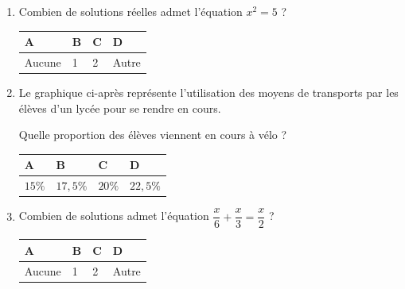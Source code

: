 \documentclass[oneside,12pt]{exam}          %
\begin{document}
\begin{enumerate}[resume*]



	\item Combien de solutions réelles admet l'équation $x^2 = 5$ ?
	
		\hspace{\linewidth-\textwidth}
		\renewcommand{\arraystretch}{1.5}
		\begin{tabular}{| P{0.22\textwidth} | P{0.22\textwidth} | P{0.22\textwidth} | P{0.22\textwidth} |} \hline
			A & B & C & D \\ \hline
			Aucune & 1 & 2 & Autre \\ \hline
		\end{tabular}
		
		

	\item
	\begin{minipage}{0.45\textwidth} \restoreskip
		Le graphique ci-après représente l'utilisation des moyens de transports par les élèves d'un lycée pour se rendre en cours.
		
		Quelle proportion des élèves viennent en cours à vélo ?
	\end{minipage}
	\begin{minipage}{0.35\textwidth}
	\end{minipage}
	
	
		\hspace{\linewidth-\textwidth}
		\renewcommand{\arraystretch}{1.5}
		\begin{tabular}{| P{0.22\textwidth} | P{0.22\textwidth} | P{0.22\textwidth} | P{0.22\textwidth} |} \hline
			A & B & C & D \\ \hline
			$15\%$& $17,5\%$ & $20\%$ & $22,5\%$ \\ \hline
		\end{tabular}

		

	\item Combien de solutions admet l'équation $\dfrac{x}{6} + \dfrac{x}{3} = \dfrac{x}{2}$ ?
	
		\hspace{\linewidth-\textwidth}
		\renewcommand{\arraystretch}{1.5}
		\begin{tabular}{| P{0.22\textwidth} | P{0.22\textwidth} | P{0.22\textwidth} | P{0.22\textwidth} |} \hline
			A & B & C & D \\ \hline
			Aucune & 1 & 2 & Autre \\ \hline
		\end{tabular}
		

\end{enumerate}
\end{document}
